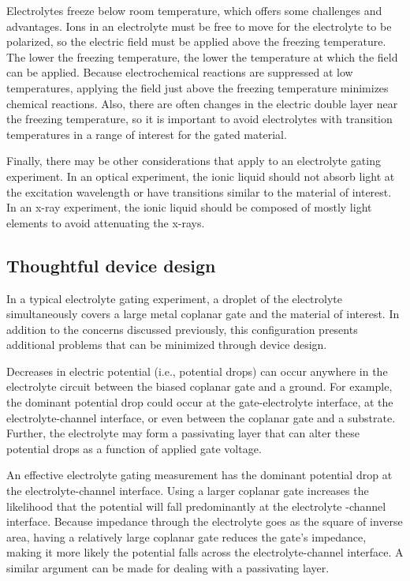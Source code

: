Electrolytes freeze below room temperature, which offers some challenges and advantages. Ions in an electrolyte must be free to move for the electrolyte to be polarized, so the electric field must be applied above the freezing temperature. The lower the freezing temperature, the lower the temperature at which the field can be applied. Because electrochemical reactions are suppressed at low temperatures, applying the field just above the freezing temperature minimizes chemical reactions. Also, there are often changes in the electric double layer near the freezing temperature, so it is important to avoid electrolytes with transition temperatures in a range of interest for the gated material.

Finally, there may be other considerations that apply to an electrolyte gating experiment. In an optical experiment, the ionic liquid should not absorb light at the excitation wavelength or have transitions similar to the material of interest. In an x-ray experiment, the ionic liquid should be composed of mostly light elements to avoid attenuating the x-rays.

\subsection{Thoughtful device design}

In a typical electrolyte gating experiment, a droplet of the electrolyte simultaneously covers a large metal coplanar gate and the material of interest. In addition to the concerns discussed previously, this configuration presents additional problems that can be minimized through device design.

Decreases in electric potential (i.e., potential drops) can occur anywhere in the electrolyte circuit between the biased coplanar gate and a ground. For example, the dominant potential drop could occur at the gate-electrolyte interface, at the electrolyte-channel interface, or even between the coplanar gate and a substrate. Further, the electrolyte may form a passivating layer that can alter these potential drops as a function of applied gate voltage.

An effective electrolyte gating measurement has the dominant potential drop at the electrolyte-channel interface. Using a larger coplanar gate increases the likelihood that the potential will fall predominantly at the electrolyte -channel interface. Because impedance through the electrolyte goes as the square of inverse area, having a relatively large coplanar gate reduces the gate's impedance, making it more likely the potential falls across the electrolyte-channel interface. A similar argument can be made for dealing with a passivating layer.

